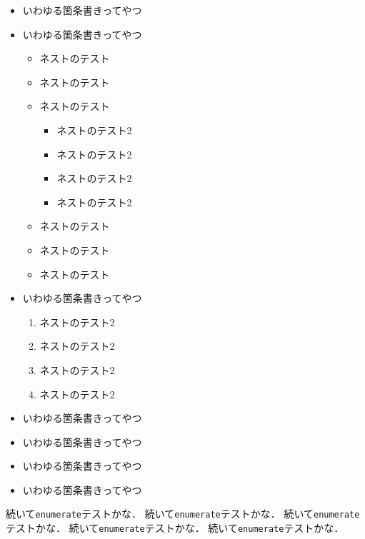 \begin{itemize}
\item いわゆる箇条書きってやつ
\item いわゆる箇条書きってやつ
 \begin{itemize}
    \item ネストのテスト
    \item ネストのテスト
    \item ネストのテスト
     \begin{itemize}
       \item ネストのテスト2
       \item ネストのテスト2
       \item ネストのテスト2
       \item ネストのテスト2
     \end{itemize}
    \item ネストのテスト
    \item ネストのテスト\
    \item ネストのテスト
 \end{itemize}
\item いわゆる箇条書きってやつ
     \begin{enumerate}
       \item ネストのテスト2
       \item ネストのテスト2
       \item ネストのテスト2
       \item ネストのテスト2
     \end{enumerate}
\item いわゆる箇条書きってやつ
\item いわゆる箇条書きってやつ
\item いわゆる箇条書きってやつ
\item いわゆる箇条書きってやつ
\end{itemize}

続いて\verb+enumerate+テストかな．
続いて\verb+enumerate+テストかな．
続いて\verb+enumerate+テストかな．
続いて\verb+enumerate+テストかな．
続いて\verb+enumerate+テストかな．

